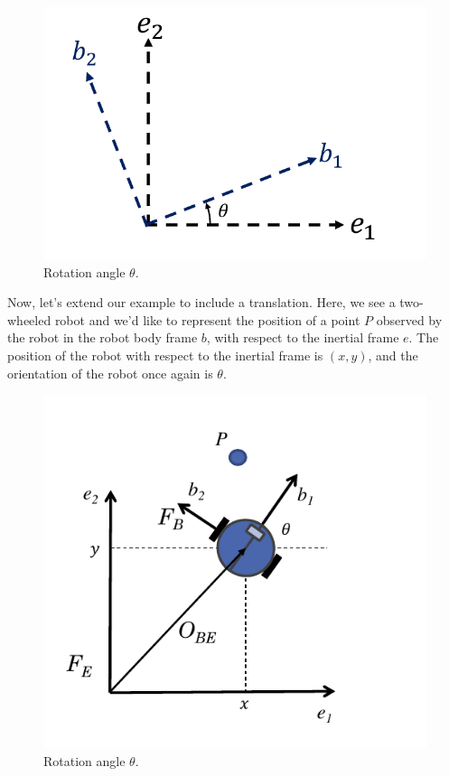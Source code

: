 \begin{figure}[!htb]
\begin{center}
\includegraphics[scale=0.290]{img/coordinate_transforms/theta_angle.jpeg}
\end{center}
\caption{Rotation angle $\theta$.}
\label{theta_angle}
\end{figure}


Now, let's extend our example to include a translation. Here, we see a two-wheeled robot and we'd like to represent the position of a point $P$ 
observed by the robot in the robot body frame $b$, with respect to the inertial frame $e$. 
The position of the robot with respect to the inertial frame is $(x, y)$, and the orientation of the robot once again is $\theta$.


\begin{figure}[!htb]
\begin{center}
\includegraphics[scale=0.290]{img/coordinate_transforms/robot_orientation.jpeg}
\end{center}
\caption{Rotation angle $\theta$.}
\label{robot_orientation}
\end{figure}

